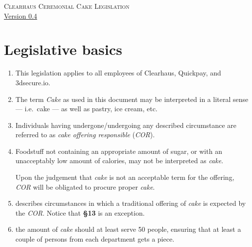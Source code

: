\documentclass[a4paper, oneside, article]{memoir}
\newcounter{tbc}
\begin{document}
    \thispagestyle{empty} %
    \begin{center}
        \textsc{\huge Clearhaus Ceremonial Cake Legislation}
        \\
        {\footnotesize \href{https://semver.org/}{Version 0.4}}
    \end{center}


    \chapter{Legislative basics}

    \begin{enumerate}[§ 1]
        \item This legislation applies to all employees of Clearhaus, Quickpay, and 3dsecure.io.


        \item The term \emph{Cake} as used in this document may be
        interpreted in a literal sense --- i.e.\ cake --- as well as pastry, ice
        cream, etc.

        \item Individuals having undergone/undergoing any described circumstance are
        referred to as \emph{cake offering responsible} (\emph{COR}).

        \item Foodstuff not containing an appropriate amount of sugar, or with an
        unacceptably low amount of calories, may not be interpreted as
        \emph{cake}.

        Upon the judgement that \emph{cake} is not an acceptable term for the
        offering, \emph{COR} will be obligated to procure proper \emph{cake}.

        \item {} describes circumstances in which a traditional
        offering of \emph{cake} is expected by the \emph{COR}. Notice that
        \textbf{§13} is an exception.

        \item the amount of \emph{cake} should at least serve 50 people, ensuring that at least a couple of persons from each department gets a piece.


        \setcounter{tbc}{\value{enumi}}
    \end{enumerate}
\end{document}
